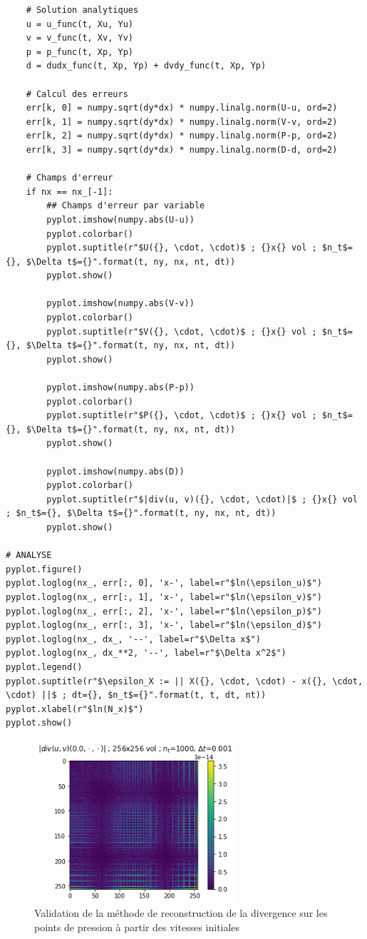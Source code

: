 \begin{verbatim}
    # Solution analytiques
    u = u_func(t, Xu, Yu)
    v = v_func(t, Xv, Yv)
    p = p_func(t, Xp, Yp)
    d = dudx_func(t, Xp, Yp) + dvdy_func(t, Xp, Yp)
    
    # Calcul des erreurs
    err[k, 0] = numpy.sqrt(dy*dx) * numpy.linalg.norm(U-u, ord=2)
    err[k, 1] = numpy.sqrt(dy*dx) * numpy.linalg.norm(V-v, ord=2)
    err[k, 2] = numpy.sqrt(dy*dx) * numpy.linalg.norm(P-p, ord=2)
    err[k, 3] = numpy.sqrt(dy*dx) * numpy.linalg.norm(D-d, ord=2)

    # Champs d'erreur
    if nx == nx_[-1]:
        ## Champs d'erreur par variable
        pyplot.imshow(numpy.abs(U-u))
        pyplot.colorbar()
        pyplot.suptitle(r"$U({}, \cdot, \cdot)$ ; {}x{} vol ; $n_t$={}, $\Delta t$={}".format(t, ny, nx, nt, dt))
        pyplot.show()
        
        pyplot.imshow(numpy.abs(V-v))
        pyplot.colorbar()
        pyplot.suptitle(r"$V({}, \cdot, \cdot)$ ; {}x{} vol ; $n_t$={}, $\Delta t$={}".format(t, ny, nx, nt, dt))
        pyplot.show()
        
        pyplot.imshow(numpy.abs(P-p))
        pyplot.colorbar()
        pyplot.suptitle(r"$P({}, \cdot, \cdot)$ ; {}x{} vol ; $n_t$={}, $\Delta t$={}".format(t, ny, nx, nt, dt))
        pyplot.show()    
        
        pyplot.imshow(numpy.abs(D))
        pyplot.colorbar()
        pyplot.suptitle(r"$|div(u, v)({}, \cdot, \cdot)|$ ; {}x{} vol ; $n_t$={}, $\Delta t$={}".format(t, ny, nx, nt, dt))
        pyplot.show()

# ANALYSE
pyplot.figure()
pyplot.loglog(nx_, err[:, 0], 'x-', label=r"$ln(\epsilon_u)$")
pyplot.loglog(nx_, err[:, 1], 'x-', label=r"$ln(\epsilon_v)$")
pyplot.loglog(nx_, err[:, 2], 'x-', label=r"$ln(\epsilon_p)$")
pyplot.loglog(nx_, err[:, 3], 'x-', label=r"$ln(\epsilon_d)$")
pyplot.loglog(nx_, dx_, '--', label=r"$\Delta x$")
pyplot.loglog(nx_, dx_**2, '--', label=r"$\Delta x^2$")
pyplot.legend()
pyplot.suptitle(r"$\epsilon_X := || X({}, \cdot, \cdot) - x({}, \cdot, \cdot) ||$ ; dt={}, $n_t$={}".format(t, t, dt, nt))
pyplot.xlabel(r"$ln(N_x)$")
pyplot.show()
\end{verbatim}

\begin{figure}[htp]
    \centering
    \includegraphics[width=7.5cm]{Images/stokes/sip/Dh0.png}
    \caption{Validation de la méthode de reconstruction de la divergence sur les points de pression à partir des vitesses initiales}
\end{figure}

